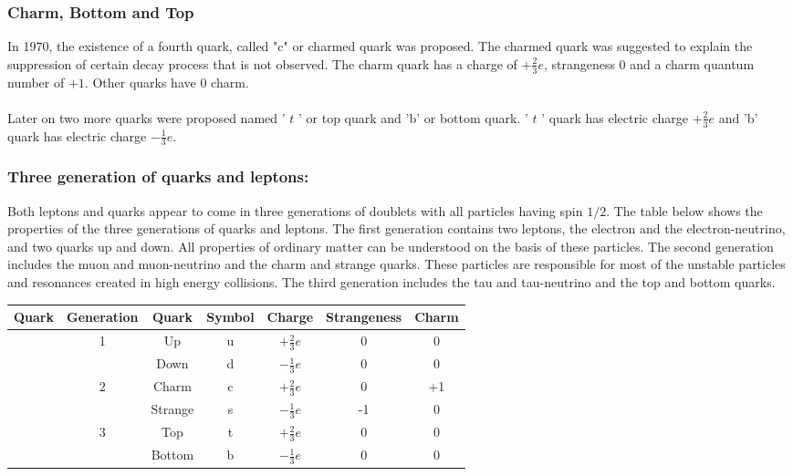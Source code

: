 \subsubsection{Charm, Bottom and Top}
In 1970, the existence of a fourth quark, called "c" or charmed quark was proposed. The charmed quark was suggested to explain the suppression of certain decay process that is not observed. The charm quark has a charge of $+\frac{2}{3} e$, strangeness 0 and a charm quantum number of $+1$. Other quarks have 0 charm.\\\\
Later on two more quarks were proposed named ' $t$ ' or top quark and 'b' or bottom quark. ' $t$ ' quark has electric charge $+\frac{2}{3} e$ and 'b' quark has electric charge $-\frac{1}{3} e$.
\subsubsection{Three generation of quarks and leptons:}
Both leptons and quarks appear to come in three generations of doublets with all particles having spin $1 / 2$. The table below shows the properties of the three generations of quarks and leptons. The first generation contains two leptons, the electron and the electron-neutrino, and two quarks up and down. All properties of ordinary matter can be understood on the basis of these particles. The second generation includes the muon and muon-neutrino and the charm and strange quarks. These particles are responsible for most of the unstable particles and resonances created in high energy collisions. The third generation includes the tau and tau-neutrino and the top and bottom quarks.\\
\renewcommand*{\arraystretch}{1.5}
\begin{tabular}{|c|c|c|c|c|c|c|}
	\hline
	\multirow{7}{*}{Quark}&Generation&Quark&Symbol&Charge&Strangeness&Charm\\\hline
	&\multirow{2}{*}{1}&Up&u&$+\frac{2}{3} e$&0&0\\\cline{3-7}
	&&Down&d&$-\frac{1}{3} e$&0&0\\\cline{2-7}
	&\multirow{2}{*}{2}&Charm&c&$+\frac{2}{3} e$&0&+1\\\cline{3-7}
	&&Strange&s&$-\frac{1}{3} e$&-1&0\\\cline{2-7}
	&\multirow{2}{*}{3}&Top&t&$+\frac{2}{3} e$&0&0\\\cline{3-7}
	&&Bottom&b&$-\frac{1}{3} e$&0&0\\\cline{1-7}
\end{tabular}

